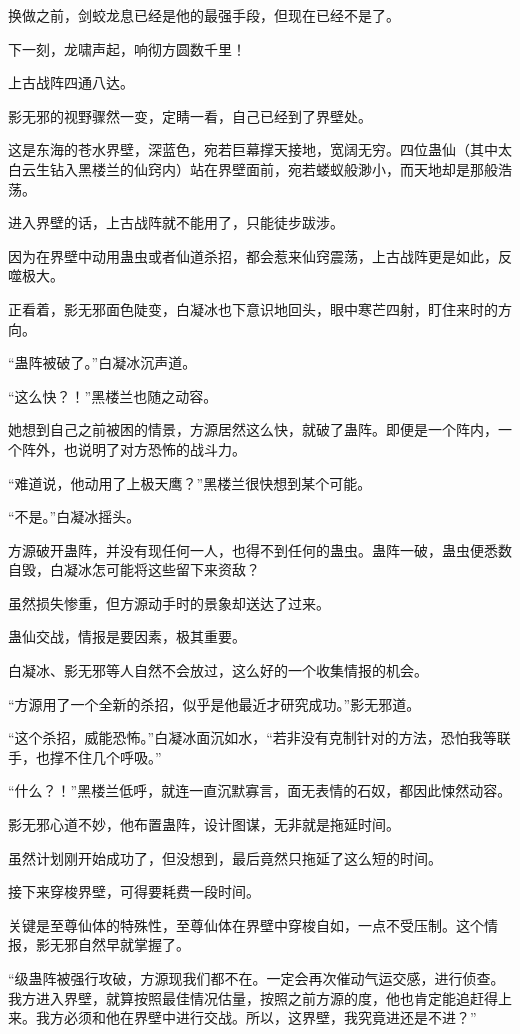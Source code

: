 \begin{this_body}
换做之前，剑蛟龙息已经是他的最强手段，但现在已经不是了。

下一刻，龙啸声起，响彻方圆数千里！

上古战阵四通八达。

影无邪的视野骤然一变，定睛一看，自己已经到了界壁处。

这是东海的苍水界壁，深蓝色，宛若巨幕撑天接地，宽阔无穷。四位蛊仙（其中太白云生钻入黑楼兰的仙窍内）站在界壁面前，宛若蝼蚁般渺小，而天地却是那般浩荡。

进入界壁的话，上古战阵就不能用了，只能徒步跋涉。

因为在界壁中动用蛊虫或者仙道杀招，都会惹来仙窍震荡，上古战阵更是如此，反噬极大。

正看着，影无邪面色陡变，白凝冰也下意识地回头，眼中寒芒四射，盯住来时的方向。

“蛊阵被破了。”白凝冰沉声道。

“这么快？！”黑楼兰也随之动容。

她想到自己之前被困的情景，方源居然这么快，就破了蛊阵。即便是一个阵内，一个阵外，也说明了对方恐怖的战斗力。

“难道说，他动用了上极天鹰？”黑楼兰很快想到某个可能。

“不是。”白凝冰摇头。

方源破开蛊阵，并没有现任何一人，也得不到任何的蛊虫。蛊阵一破，蛊虫便悉数自毁，白凝冰怎可能将这些留下来资敌？

虽然损失惨重，但方源动手时的景象却送达了过来。

蛊仙交战，情报是要因素，极其重要。

白凝冰、影无邪等人自然不会放过，这么好的一个收集情报的机会。

“方源用了一个全新的杀招，似乎是他最近才研究成功。”影无邪道。

“这个杀招，威能恐怖。”白凝冰面沉如水，“若非没有克制针对的方法，恐怕我等联手，也撑不住几个呼吸。”

“什么？！”黑楼兰低呼，就连一直沉默寡言，面无表情的石奴，都因此悚然动容。

影无邪心道不妙，他布置蛊阵，设计图谋，无非就是拖延时间。

虽然计划刚开始成功了，但没想到，最后竟然只拖延了这么短的时间。

接下来穿梭界壁，可得要耗费一段时间。

关键是至尊仙体的特殊性，至尊仙体在界壁中穿梭自如，一点不受压制。这个情报，影无邪自然早就掌握了。

“级蛊阵被强行攻破，方源现我们都不在。一定会再次催动气运交感，进行侦查。我方进入界壁，就算按照最佳情况估量，按照之前方源的度，他也肯定能追赶得上来。我方必须和他在界壁中进行交战。所以，这界壁，我究竟进还是不进？”


\end{this_body}
